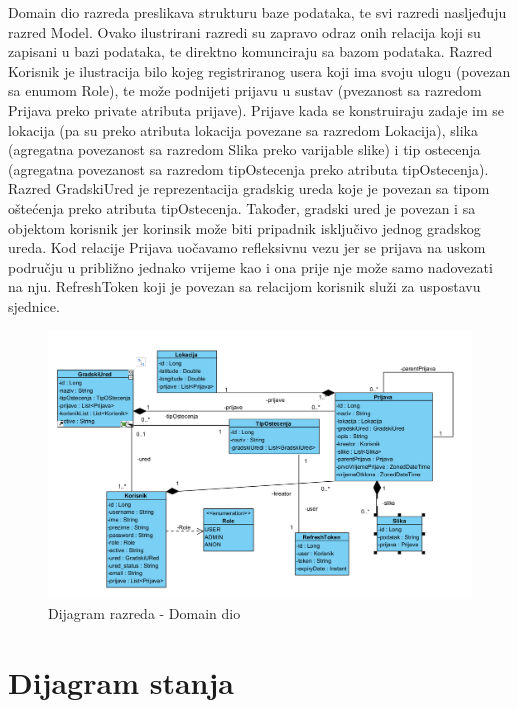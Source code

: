		Domain dio razreda preslikava strukturu baze podataka, te svi razredi nasljeđuju razred Model. Ovako ilustrirani razredi su zapravo odraz onih relacija koji su zapisani u bazi podataka, te direktno komunciraju sa bazom podataka. Razred Korisnik je ilustracija bilo kojeg registriranog usera koji ima svoju ulogu (povezan sa enumom Role), te može podnijeti prijavu u sustav (pvezanost sa razredom Prijava preko private atributa prijave). Prijave kada se konstruiraju zadaje im se lokacija (pa su preko atributa lokacija povezane sa razredom Lokacija), slika (agregatna povezanost sa razredom Slika preko varijable slike) i tip ostecenja (agregatna povezanost sa razredom tipOstecenja preko atributa tipOstecenja). Razred GradskiUred je reprezentacija gradskig ureda koje je povezan sa tipom oštećenja preko atributa tipOstecenja. Također, gradski ured je povezan i sa objektom korisnik jer korinsik može biti pripadnik isključivo jednog gradskog ureda. Kod relacije Prijava uočavamo refleksivnu vezu jer se prijava na uskom području u približno jednako vrijeme kao i ona prije nje može samo nadovezati na nju. RefreshToken koji je povezan sa relacijom korisnik služi za uspostavu sjednice. \\
		
		
			\begin{figure}[H]
			\includegraphics[scale=0.5]{slike/domain.PNG} %
			\centering
			\caption{Dijagram razreda - Domain dio}
			\label{fig:bazapod}
		\end{figure}
			
			
			\eject
		\section{Dijagram stanja}
			
